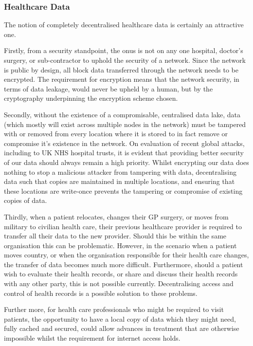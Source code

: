 \subsubsection{Healthcare Data}

The notion of completely decentralised healthcare data is certainly an attractive one.

Firstly, from a security standpoint, the onus is not on any one hospital, doctor's surgery, or sub-contractor to uphold the security of a network. Since the network is public by design, all block data transferred through the network needs to be encrypted. The requirement for encryption means that the network security, in terms of data leakage, would never be upheld by a human, but by the cryptography underpinning the encryption scheme chosen.

Secondly, without the existence of a compromisable, centralised data lake, data (which mostly will exist across multiple nodes in the network) must be tampered with or removed from every location where it is stored to in fact remove or compromise it's existence in the network. On evaluation of recent global attacks, including to UK NHS hospital trusts, it is evident that providing better security of our data should always remain a high priority. Whilst encrypting our data does nothing to stop a malicious attacker from tampering with data, decentralising data such that copies are maintained in multiple locations, and ensuring that these locations are write-once prevents the tampering or compromise of existing copies of data.

Thirdly, when a patient relocates, changes their GP surgery, or moves from military to civilian health care, their previous healthcare provider is required to transfer all their data to the new provider. Should this be within the same organisation this can be problematic. However, in the scenario when a patient moves country, or when the organisation responsible for their health care changes, the transfer of data becomes much more difficult. Furthermore, should a patient wish to evaluate their health records, or share and discuss their health records with any other party, this is not possible currently. Decentralising access and control of health records is a possible solution to these problems.

Further more, for health care professionals who might be required to visit patients, the opportunity to have a local copy of data which they might need, fully cached and secured, could allow advances in treatment that are otherwise impossible whilst the requirement for internet access holds.
